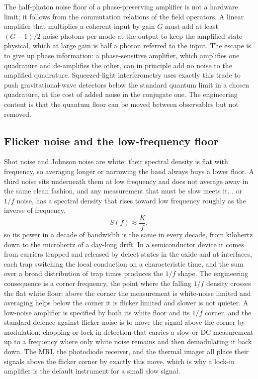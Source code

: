 \begin{mastery}
The half-photon noise floor of a phase-preserving amplifier is not a
hardware limit; it follows from the commutation relations of the field
operators. A linear amplifier that multiplies a coherent input by gain
$G$ must add at least $(G-1)/2$ noise photons per mode at the output to
keep the amplified state physical, which at large gain is half a photon
referred to the input. The escape is to give up phase information: a
phase-sensitive amplifier, which amplifies one quadrature and
de-amplifies the other, can in principle add no noise to the amplified
quadrature. Squeezed-light interferometry uses exactly this trade to
push gravitational-wave detectors below the standard quantum limit in a
chosen quadrature, at the cost of added noise in the conjugate one. The
engineering content is that the quantum floor can be moved between
observables but not removed.
\end{mastery}

\subsection{Flicker noise and the low-frequency floor}

Shot noise and Johnson noise are white: their spectral density is flat with
frequency, so averaging longer or narrowing the band always buys a lower
floor. A third noise sits underneath them at low frequency and does not
average away in the same clean fashion, and any measurement that must be
slow meets it. , or $1/f$ noise, has a spectral
density that rises toward low frequency roughly as the inverse of frequency,
\[
S(f) \approx \frac{K}{f},
\]
so its power in a decade of bandwidth is the same in every decade, from
kilohertz down to the microhertz of a day-long drift. In a semiconductor
device it comes from carriers trapped and released by defect states in the
oxide and at interfaces, each trap switching the local conduction on a
characteristic time, and the sum over a broad distribution of trap times
produces the $1/f$ shape. The engineering consequence is a corner frequency,
the point where the falling $1/f$ density crosses the flat white floor: above
the corner the measurement is white-noise limited and averaging helps below
the corner it is flicker limited and slower is not quieter. A low-noise
amplifier is specified by both its white floor and its $1/f$ corner, and the
standard defence against flicker noise is to move the signal above the
corner by modulation, chopping or lock-in detection that carries a slow or
DC measurement up to a frequency where only white noise remains and then
demodulating it back down. The MRI, the photodiode receiver, and the
thermal imager all place their signals above the flicker corner by exactly
this move, which is why a lock-in amplifier is the default instrument for a
small slow signal.

